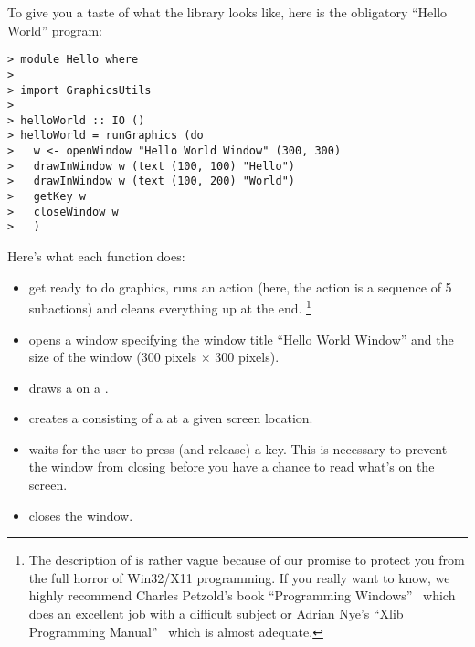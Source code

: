 To give you a taste of what the library looks like, here is the 
obligatory ``Hello World'' program:

\begin{verbatim}
> module Hello where
>
> import GraphicsUtils
>
> helloWorld :: IO ()
> helloWorld = runGraphics (do
>   w <- openWindow "Hello World Window" (300, 300)
>   drawInWindow w (text (100, 100) "Hello")
>   drawInWindow w (text (100, 200) "World")
>   getKey w
>   closeWindow w
>   )
\end{verbatim}

Here's what each function does:
\begin{itemize}
\item
   get \Hugs{} ready to do graphics,
  runs an action (here, the action is a sequence of 5 subactions) and
  cleans everything up at the end.%
  \footnote{%
    The description of
     is rather vague because of our promise to protect
    you from the full horror of Win32/X11 programming.  If you really want to
    know, we highly recommend Charles Petzold's book ``Programming
    Windows''~\cite{petzold}
    which does an excellent job with a difficult subject or Adrian Nye's 
    ``Xlib Programming Manual''~\cite{Xlib} which is almost adequate.%
  }

\item
   opens a window 
  specifying the window title ``Hello World Window'' and the size
  of the window (300 pixels $\times$ 300 pixels).

\item
   draws a 
  on a .

\item
   creates a 
  consisting of a  at a given screen location. 

\item
   waits for the user to press
  (and release) a key.  This is necessary to prevent the window
  from closing before you have a chance to read what's on the screen.

\item
   closes the window.

\end{itemize}

